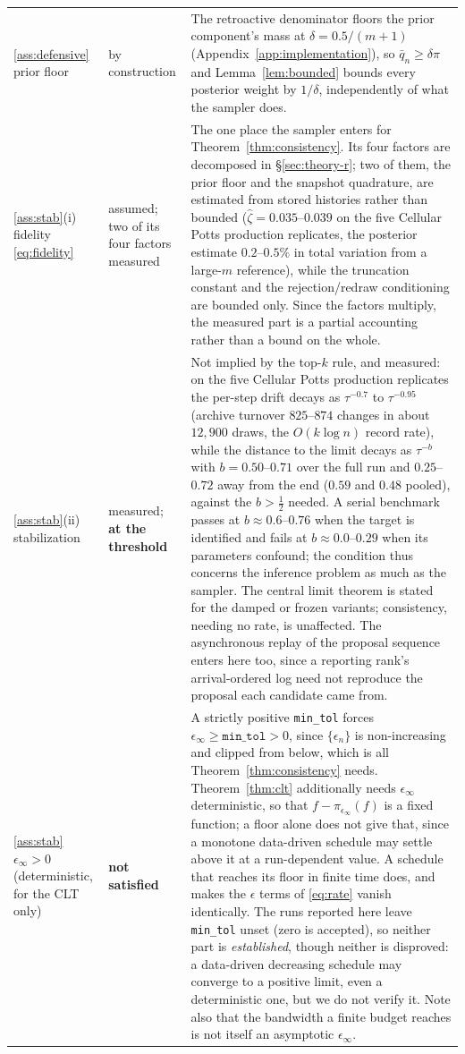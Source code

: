 \documentclass[10pt]{article}
\theoremstyle{plain}
\theoremstyle{definition}
\begin{document}
\begin{table}[h]
\begin{tabular}{@{}p{}p{}p{}@{}}
\ref{ass:defensive} prior floor & by construction & The retroactive denominator floors the prior component's mass at $\delta=0.5/(m{+}1)$ (Appendix~\ref{app:implementation}), so $\bar q_n\ge\delta\pi$ and Lemma~\ref{lem:bounded} bounds every posterior weight by $1/\delta$, independently of what the sampler does. \\
\ref{ass:stab}(i) fidelity \eqref{eq:fidelity} & assumed; two of its four factors measured & The one place the sampler enters for Theorem~\ref{thm:consistency}. Its four factors are decomposed in \S\ref{sec:theory-r}; two of them, the prior floor and the snapshot quadrature, are estimated from stored histories rather than bounded ($\widehat\zeta=0.035$--$0.039$ on the five Cellular Potts production replicates, the posterior estimate $0.2$--$0.5\%$ in total variation from a large-$m$ reference), while the truncation constant and the rejection/redraw conditioning are bounded only. Since the factors multiply, the measured part is a partial accounting rather than a bound on the whole. \\
\ref{ass:stab}(ii) stabilization & measured; \textbf{at the threshold} & Not implied by the top-$k$ rule, and measured: on the five Cellular Potts production replicates the per-step drift decays as $\tau^{-0.7}$ to $\tau^{-0.95}$ (archive turnover $825$--$874$ changes in about $12{,}900$ draws, the $O(k\log n)$ record rate), while the distance to the limit decays as $\tau^{-b}$ with $b=0.50$--$0.71$ over the full run and $0.25$--$0.72$ away from the end ($0.59$ and $0.48$ pooled), against the $b>\tfrac12$ needed. A serial benchmark passes at $b\approx0.6$--$0.76$ when the target is identified and fails at $b\approx0.0$--$0.29$ when its parameters confound; the condition thus concerns the inference problem as much as the sampler. The central limit theorem is stated for the damped or frozen variants; consistency, needing no rate, is unaffected. The asynchronous replay of the proposal sequence enters here too, since a reporting rank's arrival-ordered log need not reproduce the proposal each candidate came from. \\
\ref{ass:stab} $\epsilon_\infty>0$ (deterministic, for the CLT only) & \textbf{not satisfied} & A strictly positive \texttt{min\_tol} forces $\epsilon_\infty\ge\texttt{min\_tol}>0$, since $\{\epsilon_n\}$ is non-increasing and clipped from below, which is all Theorem~\ref{thm:consistency} needs. Theorem~\ref{thm:clt} additionally needs $\epsilon_\infty$ deterministic, so that $f-\pi_{\epsilon_\infty}(f)$ is a fixed function; a floor alone does not give that, since a monotone data-driven schedule may settle above it at a run-dependent value. A schedule that reaches its floor in finite time does, and makes the $\epsilon$ terms of \eqref{eq:rate} vanish identically. The runs reported here leave \texttt{min\_tol} unset (zero is accepted), so neither part is \emph{established}, though neither is disproved: a data-driven decreasing schedule may converge to a positive limit, even a deterministic one, but we do not verify it. Note also that the bandwidth a finite budget reaches is not itself an asymptotic $\epsilon_\infty$. \\

\end{tabular}
\end{table}
\end{document}
